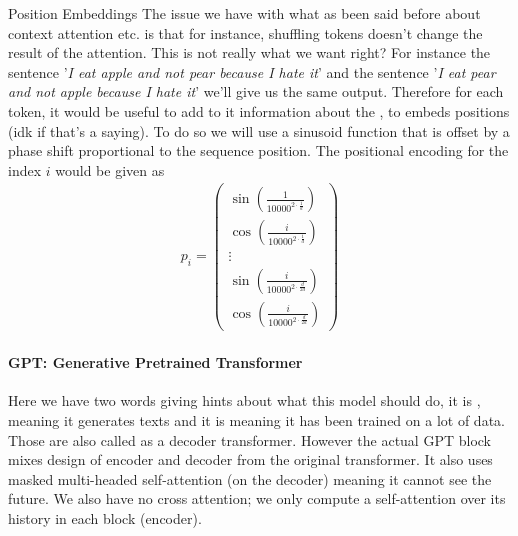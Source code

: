 \begin{parag}{Position Embeddings}
	The issue we have with what as been said before about context attention etc. is that for instance, shuffling tokens doesn't change the result of the attention. This is not really what we want right? For instance the sentence '\textit{I eat apple and not pear because I hate it}' and the sentence '\textit{I eat pear and not apple because I hate it}' we'll give us the same output. Therefore for each token, it would be useful to add to it information about the , to embeds positions (idk if that's a saying). To do so we will use a sinusoid function that is offset by a phase shift proportional to the sequence position. The positional encoding for the index $i$ would be given as 
	\begin{align*} 
		p_i = \begin{pmatrix} \sin\left(\frac{1}{10000^{2 \cdot  \frac{1}{d}}}\right) \\ \cos\left(\frac{i}{10000^{2 \cdot \frac{1}{d}}}\right)\\ \vdots \\ \sin\left(\frac{i}{10000^{2 \cdot  \frac{d}{2d}}}\right) \\  \cos\left(\frac{i}{10000^{2 \cdot  \frac{d}{2d}}}\right)\end{pmatrix} 
	\end{align*}

\end{parag}



\paragraph{GPT: Generative Pretrained Transformer}%
\label{par:GPT: Generative Pretrained Transformer}
Here we have two words giving hints about what this model should do, it is , meaning it generates texts and it is  meaning it has been trained on a lot of data. Those are also called as a decoder transformer. However the actual GPT block mixes design of encoder and decoder from the original transformer. It also uses masked multi-headed self-attention (on the decoder) meaning it cannot see the future. We also have no cross attention; we only compute a self-attention over its history in each block (encoder).

